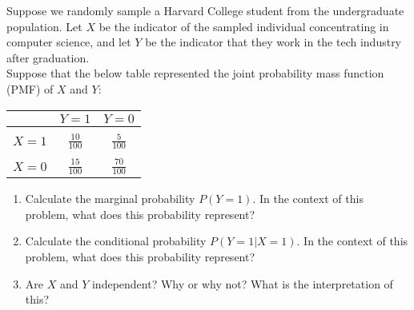 \documentclass{harvardml}
\theoremstyle{definition}
\theoremstyle{plain}
\begin{document}
\begin{problem}
Suppose we randomly sample a Harvard College student from the undergraduate population.  Let $X$ be the indicator of the sampled individual concentrating in computer science, and let $Y$ be the indicator that they work in the tech industry after graduation.\\

Suppose that the below table represented the joint probability mass function (PMF) of $X$ and $Y$:

\begin{center}
\begin{tabular}{ c | c c }
  & $Y = 1$ & $Y = 0$ \\ \hline\\
 $X = 1$ & $\frac{10}{100}$ & $\frac{5}{100}$ \\  \\
 $X = 0$ & $\frac{15}{100}$ & $\frac{70}{100}$ \\   
\end{tabular}
\end{center}


\begin{enumerate} [label=(\alph*)] 
\item Calculate the marginal probability $P(Y = 1)$.  In the context of this problem, what does this probability represent?
\item Calculate the conditional probability $P(Y = 1 | X = 1)$.  In the context of this problem, what does this probability represent?
\item Are $X$ and $Y$ independent?  Why or why not? What is the interpretation of this?

\end{enumerate}
\end{problem}
\end{document}
